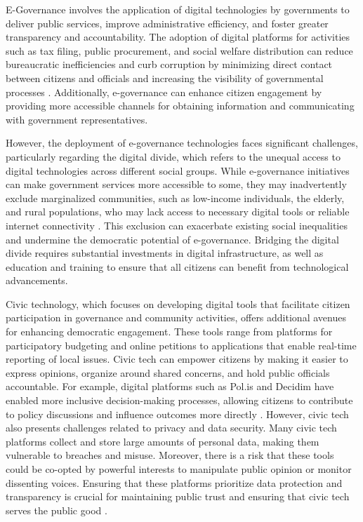 \begin{refsection}
E-Governance involves the application of digital technologies by governments to deliver public services, improve administrative efficiency, and foster greater transparency and accountability. The adoption of digital platforms for activities such as tax filing, public procurement, and social welfare distribution can reduce bureaucratic inefficiencies and curb corruption by minimizing direct contact between citizens and officials and increasing the visibility of governmental processes \cite[pp.~103-106]{norris2001digitaldivide}. Additionally, e-governance can enhance citizen engagement by providing more accessible channels for obtaining information and communicating with government representatives.

However, the deployment of e-governance technologies faces significant challenges, particularly regarding the digital divide, which refers to the unequal access to digital technologies across different social groups. While e-governance initiatives can make government services more accessible to some, they may inadvertently exclude marginalized communities, such as low-income individuals, the elderly, and rural populations, who may lack access to necessary digital tools or reliable internet connectivity \cite[pp.~14-17]{mossberger2008digital}. This exclusion can exacerbate existing social inequalities and undermine the democratic potential of e-governance. Bridging the digital divide requires substantial investments in digital infrastructure, as well as education and training to ensure that all citizens can benefit from technological advancements.

Civic technology, which focuses on developing digital tools that facilitate citizen participation in governance and community activities, offers additional avenues for enhancing democratic engagement. These tools range from platforms for participatory budgeting and online petitions to applications that enable real-time reporting of local issues. Civic tech can empower citizens by making it easier to express opinions, organize around shared concerns, and hold public officials accountable. For example, digital platforms such as Pol.is and Decidim have enabled more inclusive decision-making processes, allowing citizens to contribute to policy discussions and influence outcomes more directly \cite[pp.~112-115]{goldsmith2004governing}. However, civic tech also presents challenges related to privacy and data security. Many civic tech platforms collect and store large amounts of personal data, making them vulnerable to breaches and misuse. Moreover, there is a risk that these tools could be co-opted by powerful interests to manipulate public opinion or monitor dissenting voices. Ensuring that these platforms prioritize data protection and transparency is crucial for maintaining public trust and ensuring that civic tech serves the public good \cite[pp.~102-105]{howard2006newmedia}.


\end{refsection}
